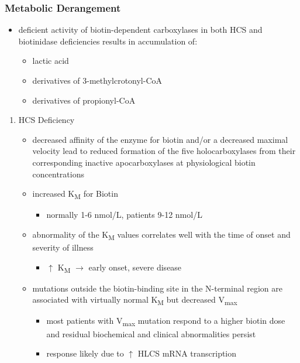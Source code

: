 \documentclass[12pt]{scrartcl}
\begin{document}
\subsubsection{Metabolic Derangement}
\label{sec:org16bf456}
\begin{itemize}
\item deficient activity of biotin-dependent carboxylases in both HCS and
biotinidase deficiencies results in accumulation of:
\begin{itemize}
\item lactic acid
\item derivatives of 3-methylcrotonyl-CoA
\item derivatives of propionyl-CoA
\end{itemize}
\end{itemize}
\begin{enumerate}
\item HCS Deficiency
\label{sec:orgad5af7b}
\begin{itemize}
\item decreased affinity of the enzyme for biotin and/or a decreased
maximal velocity lead to reduced formation of the five
holocarboxylases from their corresponding inactive apocarboxylases
at physiological biotin concentrations
\item increased K\textsubscript{M} for Biotin
\begin{itemize}
\item normally 1-6 nmol/L, patients 9-12 nmol/L
\end{itemize}
\item abnormality of the K\textsubscript{M} values correlates well with the time of onset
and severity of illness
\begin{itemize}
\item \(\uparrow\) K\textsubscript{M} \(\to\) early onset, severe disease
\end{itemize}

\item mutations outside the biotin-binding site in the N-terminal region
are associated with virtually normal K\textsubscript{M} but decreased V\textsubscript{max}
\begin{itemize}
\item most patients with V\textsubscript{max} mutation respond to a higher biotin
dose and residual biochemical and clinical abnormalities persist
\item response likely due to \(\uparrow\) HLCS mRNA transcription
\end{itemize}
\end{itemize}


\end{enumerate}
\end{document}
